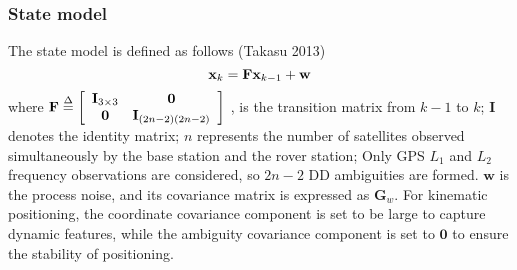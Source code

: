\documentclass{svjour3}                     %
\begin{document}
\subsubsection{State model}
The state model is defined as follows (Takasu 2013)
\begin{equation}
{{\bf{x}}_k} = {\bf{F}}{{\bf{x}}_{k - 1}} + {\bf{w}}
\end{equation}
where ${\bf{F}} \buildrel \Delta \over = \left[ {\begin{array}{*{20}{c}}
	{{{\bf{I}}_{3 \times 3}}}&{\bf{0}}\\
	{\bf{0}}&{{{\bf{I}}_{(2n - 2)(2n - 2)}}}
	\end{array}} \right]$ , is the transition matrix from $k-1$ to $k$; $\mathbf{I}$ denotes the identity matrix; $n$ represents the number of satellites observed simultaneously by the base station and the rover station; Only GPS ${{L}_{1}}$ and ${{L}_{2}}$ frequency observations are considered, so $2n-2$ DD ambiguities are formed. $\mathbf{w}$ is the process noise, and its covariance matrix is expressed as ${{\mathbf{G}}_{w}}$. For kinematic positioning, the coordinate covariance component is set to be large to capture dynamic features, while the ambiguity covariance component is set to $\mathbf{0}$ to ensure the stability of positioning.
\end{document}
